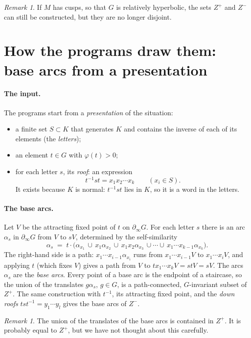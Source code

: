 \documentclass[11pt]{article}
\theoremstyle{remark}
\newtheorem{remark}[theorem]{Remark}
\begin{document}
\begin{remark}\label{rem:cusps}
If $M$ has cusps, so that $G$ is relatively hyperbolic, the sets $Z^+$ and $Z^-$ can still be constructed, but they are no
longer disjoint.
\end{remark}

\section{How the programs draw them: base arcs from a presentation}

\paragraph{The input.} The programs start from a \emph{presentation} of the situation:
\begin{itemize}
\item a finite set $S\subset K$ that generates $K$ and contains the inverse of each of its elements (the \emph{letters});
\item an element $t\in G$ with $\varphi(t)>0$;
\item for each letter $s$, its \emph{roof}: an expression
\[
t^{-1}st=x_1x_2\cdots x_k\qquad(x_i\in S).
\]
It exists because $K$ is normal: $t^{-1}st$ lies in $K$, so it is a word in the letters.
\end{itemize}

\paragraph{The base arcs.} Let $V$ be the attracting fixed point of $t$ on $\partial_\infty G$. For each letter $s$ there is an arc
$\alpha_s$ in $\partial_\infty G$ from $V$ to $sV$, determined by the self-similarity
\[
\alpha_s \;=\; t\cdot\bigl(\alpha_{x_1}\,\cup\, x_1\alpha_{x_2}\,\cup\, x_1x_2\alpha_{x_3}\,\cup\cdots\cup\,
x_1\cdots x_{k-1}\alpha_{x_k}\bigr).
\]
The right-hand side is a path: $x_1\cdots x_{i-1}\alpha_{x_i}$ runs from $x_1\cdots x_{i-1}V$ to $x_1\cdots x_iV$, and
applying $t$ (which fixes $V$) gives a path from $V$ to $tx_1\cdots x_kV=stV=sV$. The arcs $\alpha_s$ are the
\emph{base arcs}. Every point of a base arc is the endpoint of a staircase, so the union of the translates
$g\alpha_s$, $g\in G$, is a path-connected, $G$-invariant subset of $Z^+$. The same construction with $t^{-1}$,
its attracting fixed point, and the \emph{down roofs} $tst^{-1}=y_1\cdots y_l$ gives the base arcs of $Z^-$.
\begin{remark}\label{rem:union}
The union of the translates of the base arcs is contained in $Z^+$. It is probably equal to $Z^+$, but we have not
thought about this carefully.
\end{remark}
\end{document}
